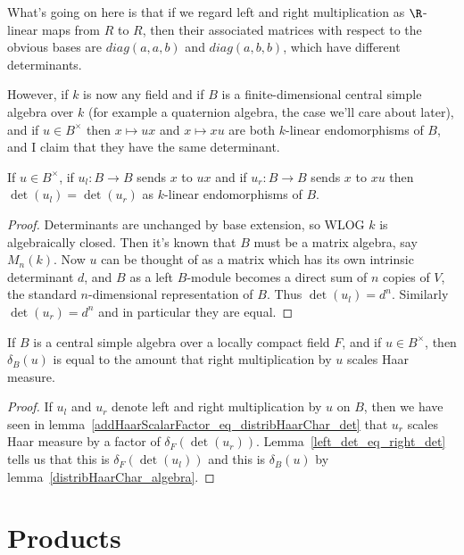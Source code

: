   What's going on here is that if we regard left and right multiplication as $\R$-linear
  maps from $R$ to $R$, then their associated matrices with respect to the obvious bases
  are $diag(a,a,b)$ and $diag(a,b,b)$, which have different determinants.

  However, if $k$ is now any field and if $B$ is a finite-dimensional central
  simple algebra over $k$ (for example a quaternion algebra, the case we'll care about later),
  and if $u\in B^\times$ then $x\mapsto ux$ and $x\mapsto xu$
  are both $k$-linear endomorphisms of $B$, and I claim that they have
  the same determinant.

\begin{lemma}
  \label{left_det_eq_right_det}
  If $u\in B^\times$, if $u_l:B\to B$ sends $x$ to $ux$ and if $u_r:B\to B$
  sends $x$ to $xu$ then $\det(u_l)=\det(u_r)$ as $k$-linear endomorphisms of $B$.
\end{lemma}
\begin{proof}
  Determinants are unchanged by base extension, so WLOG $k$ is algebraically closed.
  Then it's known that $B$ must be a matrix algebra, say $M_n(k)$. Now $u$ can be thought
  of as a matrix which has its own intrinsic determinant $d$, and $B$ as a left $B$-module
  becomes a direct sum of $n$ copies of $V$, the standard $n$-dimensional representation of $B$.
  Thus $\det(u_l)=d^n$. Similarly $\det(u_r)=d^n$ and in particular they are equal.
\end{proof}

\begin{corollary}
  If $B$ is a central simple algebra over a locally compact field $F$, and if $u\in B^\times$,
  then $\delta_B(u)$ is equal to the amount that right multiplication by $u$ scales Haar measure.
\end{corollary}
\begin{proof}
  If $u_l$ and $u_r$ denote left and right multiplication by $u$ on $B$, then we have
  seen in lemma~\ref{addHaarScalarFactor_eq_distribHaarChar_det} that $u_r$ scales Haar
  measure by a factor of $\delta_F(\det(u_r))$. Lemma~\ref{left_det_eq_right_det} tells
  us that this is $\delta_F(\det(u_l))$ and this is $\delta_B(u)$ by lemma~\ref{distribHaarChar_algebra}.
\end{proof}

\section{Products}

